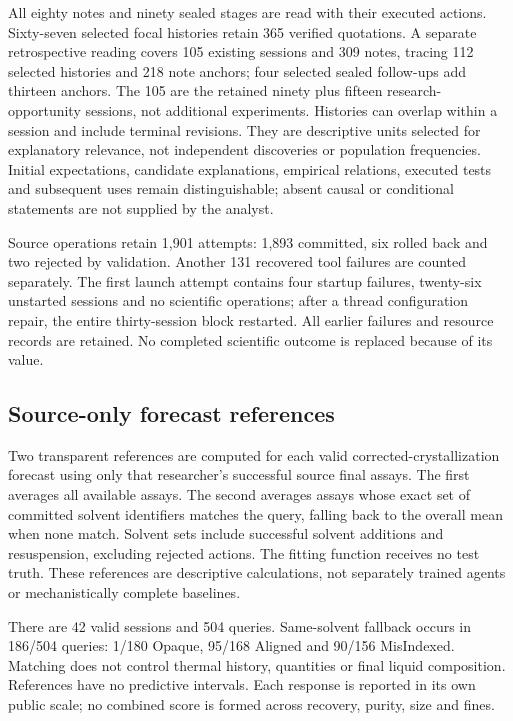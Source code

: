 \documentclass[12pt,a4paper]{article}
\begin{document}
All eighty notes and ninety sealed stages are read with their executed actions. Sixty-seven selected focal histories retain 365 verified quotations. A separate retrospective reading covers 105 existing sessions and 309 notes, tracing 112 selected histories and 218 note anchors; four selected sealed follow-ups add thirteen anchors. The 105 are the retained ninety plus fifteen research-opportunity sessions, not additional experiments. Histories can overlap within a session and include terminal revisions. They are descriptive units selected for explanatory relevance, not independent discoveries or population frequencies. Initial expectations, candidate explanations, empirical relations, executed tests and subsequent uses remain distinguishable; absent causal or conditional statements are not supplied by the analyst.

Source operations retain 1,901 attempts: 1,893 committed, six rolled back and two rejected by validation. Another 131 recovered tool failures are counted separately. The first launch attempt contains four startup failures, twenty-six unstarted sessions and no scientific operations; after a thread configuration repair, the entire thirty-session block restarted. All earlier failures and resource records are retained. No completed scientific outcome is replaced because of its value.

\subsection{Source-only forecast references}\label{source-only-forecast-references}

Two transparent references are computed for each valid corrected-crystallization forecast using only that researcher's successful source final assays. The first averages all available assays. The second averages assays whose exact set of committed solvent identifiers matches the query, falling back to the overall mean when none match. Solvent sets include successful solvent additions and resuspension, excluding rejected actions. The fitting function receives no test truth. These references are descriptive calculations, not separately trained agents or mechanistically complete baselines.

There are 42 valid sessions and 504 queries. Same-solvent fallback occurs in 186/504 queries: 1/180 Opaque, 95/168 Aligned and 90/156 MisIndexed. Matching does not control thermal history, quantities or final liquid composition. References have no predictive intervals. Each response is reported in its own public scale; no combined score is formed across recovery, purity, size and fines.
\end{document}
